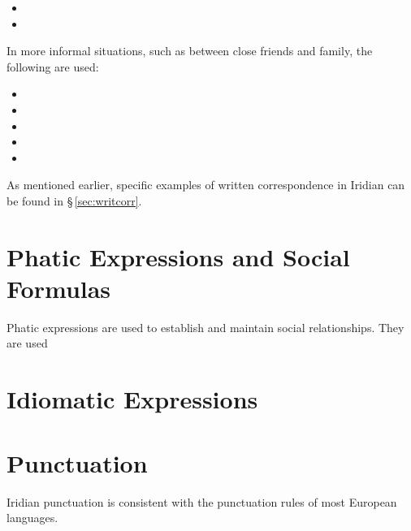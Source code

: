 \begin{itemize}[nosep]
	\item {}
	\item {}
\end{itemize}

In more informal situations, such as between close friends and family, the
following are used:

\begin{itemize}[nosep]
	\item {}
	\item {}
	\item {}
	\item {}
	\item {}
\end{itemize}

As mentioned earlier, specific examples of written correspondence in Iridian can
be found in \S\,\ref{sec:writcorr}.


\section{Phatic Expressions and Social Formulas}

Phatic expressions are used to establish and maintain social relationships. They are used 

\section{Idiomatic Expressions}

\section{Punctuation}\label{sec:punctuation}

Iridian punctuation is consistent with the punctuation rules of most European languages.


